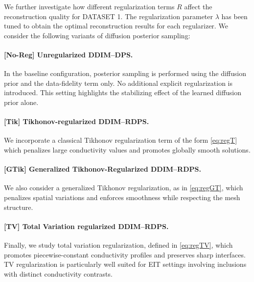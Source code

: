 \documentclass[a4paper,11pt]{article}
\theoremstyle{definition}
\theoremstyle{plain}
\theoremstyle{remark}
\begin{document}
We further investigate how different regularization terms $R$ affect the reconstruction quality for DATASET 1. The regularization parameter $\lambda$ has been tuned to obtain the optimal reconstruction results for each regularizer.
We consider the following variants of diffusion posterior sampling:

\paragraph{[No-Reg] Unregularized DDIM--DPS.}
In the baseline configuration, posterior sampling is performed using the diffusion
prior and the data-fidelity term only.
No additional explicit regularization is introduced.
This setting highlights the stabilizing effect of the learned diffusion prior
alone.

\paragraph{[Tik] Tikhonov-regularized DDIM--RDPS.}
We incorporate a classical Tikhonov regularization term of the form \eqref{eq:regT} which penalizes large conductivity values and promotes globally smooth
solutions.

\paragraph{[GTik] Generalized Tikhonov-Regularized DDIM--RDPS.}
We also consider a generalized Tikhonov regularization, as in \eqref{eq:regGT}, which penalizes spatial variations and enforces smoothness while respecting
the mesh structure.

\paragraph{[TV] Total Variation regularized DDIM--RDPS.}
Finally, we study total variation regularization, defined in \eqref{eq:regTV},
which promotes piecewise-constant conductivity profiles and preserves sharp interfaces.
TV regularization is particularly well suited for EIT settings involving
inclusions with distinct conductivity contrasts.
\end{document}
